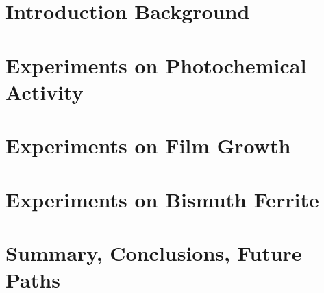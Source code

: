 \documentclass[12pt,%
               twoside,
               letterpaper]{uiothesis}
\author{Andrew M. Schultz}
\begin{document}
  
  \pagestyle{uio}


  \frontmatter
    \maketitle
    
    \cleardoublepage
	\OnehalfSpacing
    
    
    
    
    \SingleSpacing
    
    \cleardoublepage
    \tableofcontents
    
    \cleardoublepage
    \listoffigures
    
    \cleardoublepage
    \listoftables
    \OnehalfSpacing
	
    

  \mainmatter
	\DoubleSpacing 
	\part{Introduction \oldand Background} %
		
		
		
	
	\part{Experiments on Photochemical Activity}
		
	   	
		
	
	\part{Experiments on Film Growth}
   		
		
	
	\part{Experiments on Bismuth Ferrite}	
			
		
		
	\part{Summary, Conclusions, \oldand Future Paths}
		 
\SingleSpacing


%
%      
%      
%      
%      
%
\cleardoublepage
\makecolophon
\end{document}
